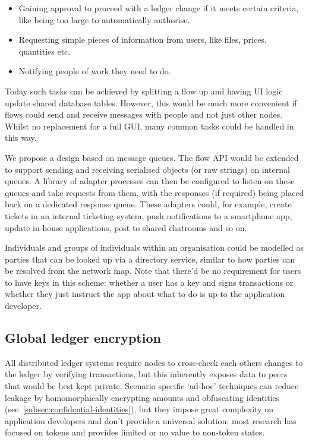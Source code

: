 \documentclass{article}
\begin{document}
\begin{itemize}
    \item Gaining approval to proceed with a ledger change if it meets certain criteria, like being too large
          to automatically authorise.
    \item Requesting simple pieces of information from users, like files, prices, quantities etc.
    \item Notifying people of work they need to do.
\end{itemize}

Today such tasks can be achieved by splitting a flow up and having UI logic update shared database tables. However,
this would be much more convenient if flows could send and receive messages with people and not just other nodes.
Whilst no replacement for a full GUI, many common tasks could be handled in this way.

We propose a design based on message queues. The flow API would be extended to support sending and receiving serialised
objects (or raw strings) on internal queues. A library of adapter processes can then be configured to listen on these
queues and take requests from them, with the responses (if required) being placed back on a dedicated response queue.
These adapters could, for example, create tickets in an internal ticketing system, push notifications to a smartphone
app, update in-house applications, post to shared chatrooms and so on.

Individuals and groups of individuals within an organisation could be modelled as parties that can be looked up via a
directory service, similar to how parties can be resolved from the network map. Note that there'd be no requirement
for users to have keys in this scheme: whether a user has a key and signs transactions or whether they just instruct
the app about what to do is up to the application developer.

\subsection{Global ledger encryption}\label{subsec:global-ledger-encryption}

All distributed ledger systems require nodes to cross-check each others changes to the ledger by verifying
transactions, but this inherently exposes data to peers that would be best kept private. Scenario specific
`ad-hoc' techniques can reduce leakage by homomorphically encrypting amounts and obfuscating identities
(see~\cref{subsec:confidential-identities}), but they impose great complexity on application developers and
don't provide a universal solution: most research has focused on tokens and provides limited or no value to
non-token states.
\end{document}
